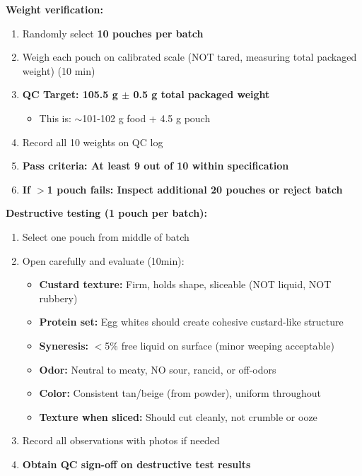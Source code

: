 \textbf{Weight verification:}
\begin{enumerate}[resume,leftmargin=1.5em]
\item Randomly select \textbf{10 pouches per batch}
\item Weigh each pouch on calibrated scale (NOT tared, measuring total packaged weight) (10 min)
\item \textbf{QC Target: 105.5 g $\pm$ 0.5 g total packaged weight}
  \begin{itemize}
  \item This is: $\sim$101-102 g food + 4.5 g pouch
  \end{itemize}
\item Record all 10 weights on QC log
\item \textbf{Pass criteria: At least 9 out of 10 within specification}
\item \textbf{If $>$1 pouch fails: Inspect additional 20 pouches or reject batch}
\end{enumerate}

\textbf{Destructive testing (1 pouch per batch):}
\begin{enumerate}[resume,leftmargin=1.5em]
\item Select one pouch from middle of batch
\item Open carefully and evaluate (10min):
  \begin{itemize}
  \item \textbf{Custard texture:} Firm, holds shape, sliceable (NOT liquid, NOT rubbery)
  \item \textbf{Protein set:} Egg whites should create cohesive custard-like structure
  \item \textbf{Syneresis:} $<$5\% free liquid on surface (minor weeping acceptable)
  \item \textbf{Odor:} Neutral to meaty, NO sour, rancid, or off-odors
  \item \textbf{Color:} Consistent tan/beige (from powder), uniform throughout
  \item \textbf{Texture when sliced:} Should cut cleanly, not crumble or ooze
  \end{itemize}
\item Record all observations with photos if needed
\item \textbf{Obtain QC sign-off on destructive test results}
\end{enumerate}

